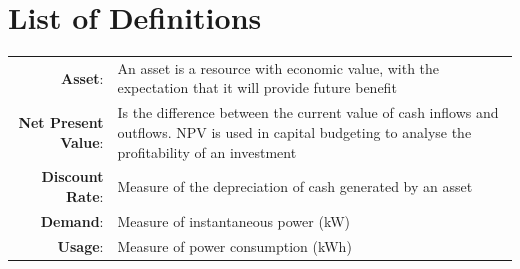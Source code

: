 \documentclass[fontsize=9.5pt]{extarticle}
\numberwithin{figure}{section} %
\begin{document}
\section*{List of Definitions}\label{defs}
\begin{tabular}{r p{12cm}}
\textbf{Asset}:& An asset is a resource with economic value, with the expectation that it will provide future benefit \\
\textbf{Net Present Value}:& Is the difference between the current value of cash inflows and outflows. NPV is used in capital budgeting to analyse the profitability of an investment \\
\textbf{Discount Rate}:& Measure of the depreciation of cash generated by an asset \\
\textbf{Demand}:& Measure of instantaneous power (kW)\\
\textbf{Usage}:& Measure of power consumption (kWh)\\
\end{tabular}

\newpage
\end{document}
